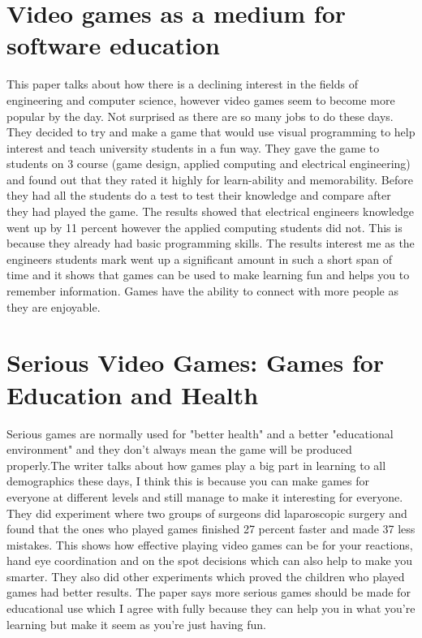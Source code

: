\documentclass{scrartcl}
\begin{document}
\section{Video games as a medium for software education \cite{marques2012video}}
This paper talks about how there is a declining interest in the fields of engineering and computer science, however video games seem to become more popular by the day. Not surprised as there are so many jobs to do these days. They decided to try and make a game that would use visual programming to help interest and teach university students in a fun way. They gave the game to students on 3 course (game design, applied computing and electrical engineering) and found out that they rated it highly for learn-ability and memorability. Before they had all the students do a test to test their knowledge and compare after they had played the game. The results showed that electrical engineers knowledge went up by 11 percent however the applied computing students did not. This is because they already had basic programming skills. The results interest me as the engineers students mark went up a significant amount in such a short span of time and it shows that games can be used to make learning fun and helps you to remember information. Games have the ability to connect with more people as they are enjoyable.



\section{Serious Video Games: Games for Education and Health \cite{janarthanan2012serious} }
Serious games are normally used for "better health" and a better "educational environment" and they don't always mean the game will be produced properly.The writer talks about how games play a big part in learning to all demographics these days, I think this is because you can make games for everyone at different levels and still manage to make it interesting for everyone. They did experiment where two groups of surgeons did laparoscopic surgery and found that the ones who played games finished 27 percent faster and made 37 less mistakes. This shows how effective playing video games can be for your reactions, hand eye coordination and on the spot decisions which can also help to make you smarter. They also did other experiments which proved the children who played games had better results. The paper says more serious games should be made for educational use which I agree with fully because they can help you in what you're learning but make it seem as you're just having fun.
\end{document}
